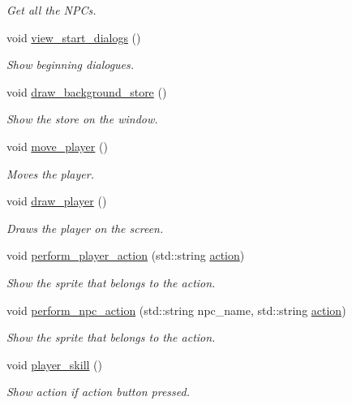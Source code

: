 \begin{DoxyCompactItemize}
\begin{DoxyCompactList}\small\item\em Get all the N\+PC\textquotesingle{}s. \end{DoxyCompactList}\item 
void \hyperlink{classgame_af99a7ac774385373a015bd3082049bd2}{view\+\_\+start\+\_\+dialogs} ()
\begin{DoxyCompactList}\small\item\em Show beginning dialogues. \end{DoxyCompactList}\item 
void \hyperlink{classgame_a4cf9147e06874edfc6190db64d719dec}{draw\+\_\+background\+\_\+store} ()
\begin{DoxyCompactList}\small\item\em Show the store on the window. \end{DoxyCompactList}\item 
void \hyperlink{classgame_ab13015cdc535671de1dd7a5a7970a238}{move\+\_\+player} ()
\begin{DoxyCompactList}\small\item\em Moves the player. \end{DoxyCompactList}\item 
void \hyperlink{classgame_a4982a1c81b1a52b8f050ef48dea86743}{draw\+\_\+player} ()
\begin{DoxyCompactList}\small\item\em Draws the player on the screen. \end{DoxyCompactList}\item 
void \hyperlink{classgame_a50870549f1abdbc924743d8173ced15d}{perform\+\_\+player\+\_\+action} (std\+::string \hyperlink{classaction}{action})
\begin{DoxyCompactList}\small\item\em Show the sprite that belongs to the action. \end{DoxyCompactList}\item 
void \hyperlink{classgame_a5b71f711786b1b48343dd02d31551a69}{perform\+\_\+npc\+\_\+action} (std\+::string npc\+\_\+name, std\+::string \hyperlink{classaction}{action})
\begin{DoxyCompactList}\small\item\em Show the sprite that belongs to the action. \end{DoxyCompactList}\item 
void \hyperlink{classgame_a478a3366ffd0e10713b0abc3adb65696}{player\+\_\+skill} ()
\begin{DoxyCompactList}\small\item\em Show action if action button pressed. \end{DoxyCompactList}\item 

\end{DoxyCompactItemize}
